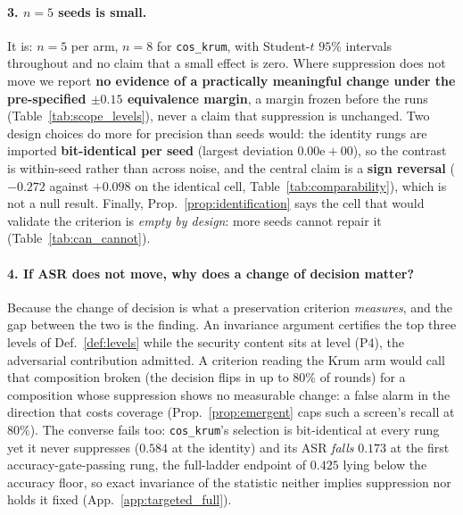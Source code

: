 \documentclass{article}
\begin{document}
\paragraph{3. $n{=}5$ seeds is small.} It is: $n{=}5$ per arm, $n{=}8$ for \texttt{cos\_krum}, with
Student-$t$ $95\%$ intervals throughout and no claim that a small effect is zero. Where suppression does
not move we report \textbf{no evidence of a practically meaningful change under the pre-specified
$\pm0.15$ equivalence margin}, a margin frozen before the runs (Table~\ref{tab:scope_levels}), never a claim
that suppression is unchanged. Two design choices do more for precision than seeds would: the identity rungs are
imported \textbf{bit-identical per seed} (largest deviation $0.00\mathrm{e}{+}00$), so the contrast is
within-seed rather than across noise, and the central claim is a \textbf{sign reversal}
($-0.272$ against $+0.098$ on the identical cell, Table~\ref{tab:comparability}), which is not a null
result. Finally, Prop.~\ref{prop:identification} says the cell that would validate the criterion is
\emph{empty by design}: more seeds cannot repair it (Table~\ref{tab:can_cannot}).

\paragraph{4. If ASR does not move, why does a change of decision matter?} Because the change of
decision is what a preservation criterion \emph{measures}, and the gap between the two is the finding.
An invariance argument certifies the top three levels of Def.~\ref{def:levels} while the security
content sits at level (P4), the adversarial contribution admitted. A criterion reading the Krum arm
would call that composition broken (the decision flips in up to $80\%$ of rounds) for a composition
whose suppression shows no measurable change: a false alarm in the direction that costs coverage
(Prop.~\ref{prop:emergent} caps such a screen's recall at $80\%$). The converse fails too:
\texttt{cos\_krum}'s selection is bit-identical at every rung yet it never suppresses ($0.584$ at the
identity) and its ASR \emph{falls} $0.173$ at the first accuracy-gate-passing rung, the full-ladder
endpoint of $0.425$ lying below the accuracy floor, so exact invariance of the statistic neither
implies suppression nor holds it fixed (App.~\ref{app:targeted_full}).
\end{document}
